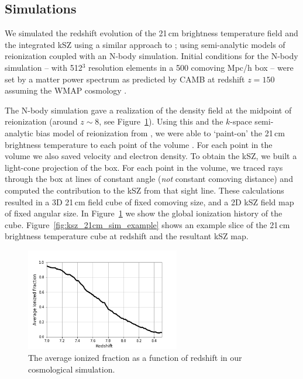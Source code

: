 \subsection{Simulations}

We simulated the redshift evolution of the 21\,cm brightness temperature field and the integrated kSZ using a similar approach to \cite{LaPlante.14}; using semi-analytic models of reionization coupled with an N-body simulation. Initial conditions for the N-body simulation -- with 512$^3$ resolution elements in a 500 comoving Mpc/h box -- were set by a matter power spectrum as predicted by CAMB \citep{Lewis.99} at redshift $z=150$ assuming the WMAP cosmology \citep{Hinshaw.13}.

The N-body simulation gave a realization of the density field at the midpoint of reionization (around $z\sim 8$, see Figure~\ref{fig:ksz_21cm_sim_ionfrac_avg}). Using this and the $k$-space semi-analytic bias model of reionization from \cite{Battaglia.13}, we were able to `paint-on' the 21\,cm brightness temperature to each point of the volume \citep{LaPlante.14}. For each point in the volume we also saved velocity and electron density. To obtain the kSZ, we built a light-cone projection of the box. For each point in the volume, we traced rays through the box at lines of constant angle (\textit{not} constant comoving distance) and computed the contribution to the kSZ from that sight line. These calculations resulted in a 3D 21\,cm field cube of fixed comoving size, and a 2D kSZ field map of fixed angular size. In Figure~\ref{fig:ksz_21cm_sim_ionfrac_avg} we show the global ionization history of the cube. Figure~\ref{fig:ksz_21cm_sim_example} shows an example slice of the 21\,cm brightness temperature cube at redshift and the resultant kSZ map. 

\begin{figure}
\centering
\includegraphics[width=0.6\textwidth]{chapters/ksz_21cm/figures/unsmoothed_ionfrac.png}
\caption{The average ionized fraction as a function of redshift in our cosmological simulation.}
\label{fig:ksz_21cm_sim_ionfrac_avg}
\end{figure}

